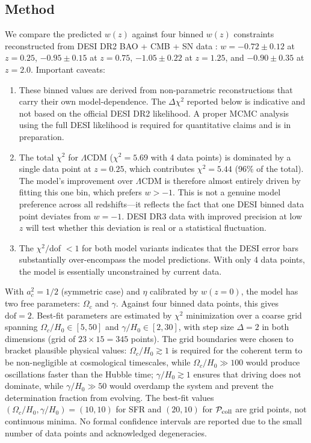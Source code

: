 \documentclass[aps,prd,twocolumn,superscriptaddress]{revtex4-2}
\begin{document}
\subsection{Method}

We compare the predicted $w(z)$ against four binned $w(z)$ constraints reconstructed from DESI DR2 BAO + CMB + SN data \cite{Li:2025,Pang:2025}: $w = -0.72 \pm 0.12$ at $z=0.25$, $-0.95 \pm 0.15$ at $z=0.75$, $-1.05 \pm 0.22$ at $z=1.25$, and $-0.90 \pm 0.35$ at $z=2.0$. Important caveats:

\begin{enumerate}
\item These binned values are derived from non-parametric reconstructions that carry their own model-dependence. The $\Delta\chi^2$ reported below is indicative and not based on the official DESI DR2 likelihood. A proper MCMC analysis using the full DESI likelihood is required for quantitative claims and is in preparation.
\item The total $\chi^2$ for $\Lambda$CDM ($\chi^2 = 5.69$ with 4 data points) is dominated by a single data point at $z=0.25$, which contributes $\chi^2 = 5.44$ (96\% of the total). The model's improvement over $\Lambda$CDM is therefore almost entirely driven by fitting this one bin, which prefers $w > -1$. This is not a genuine model preference across all redshifts---it reflects the fact that one DESI binned data point deviates from $w=-1$. DESI DR3 data with improved precision at low $z$ will test whether this deviation is real or a statistical fluctuation.
\item The $\chi^2/$dof $< 1$ for both model variants indicates that the DESI error bars substantially over-encompass the model predictions. With only 4 data points, the model is essentially unconstrained by current data.
\end{enumerate}

With $a_c^2 = 1/2$ (symmetric case) and $\eta$ calibrated by $w(z=0)$, the model has two free parameters: $\Omega_c$ and $\gamma$. Against four binned data points, this gives $\mathrm{dof} = 2$. Best-fit parameters are estimated by $\chi^2$ minimization over a coarse grid spanning $\Omega_c/H_0 \in [5, 50]$ and $\gamma/H_0 \in [2, 30]$, with step size $\Delta = 2$ in both dimensions (grid of $23 \times 15 = 345$ points). The grid boundaries were chosen to bracket plausible physical values: $\Omega_c/H_0 \gtrsim 1$ is required for the coherent term to be non-negligible at cosmological timescales, while $\Omega_c/H_0 \gg 100$ would produce oscillations faster than the Hubble time; $\gamma/H_0 \gtrsim 1$ ensures that driving does not dominate, while $\gamma/H_0 \gg 50$ would overdamp the system and prevent the determination fraction from evolving. The best-fit values $(\Omega_c/H_0, \gamma/H_0) = (10, 10)$ for SFR and $(20, 10)$ for $\mathcal{P}_{\rm coll}$ are grid points, not continuous minima. No formal confidence intervals are reported due to the small number of data points and acknowledged degeneracies.
\end{document}
